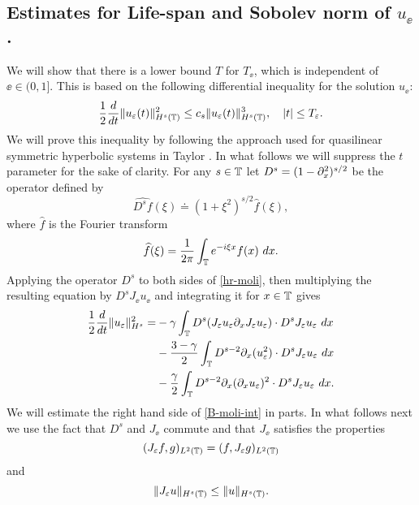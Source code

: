\subsection{Estimates  for Life-span and Sobolev norm of $u_\ee$.}
%
We will show that there is a lower bound  $T$
for $T_\ee$, which is  independent of $\ee\in(0, 1]$.
This is based on the following differential
inequality for the solution $u_\ee$:
%
\begin{equation} 
\label{B-diff-ineq}
\frac 12
\frac{d}{dt}
\|u_\varepsilon(t)\|_{H^{s}(\mathbb{T})}^2
\le
c_s
\|u_\varepsilon(t)\|_{H^{s}(\mathbb{T})}^3,
\quad
|t| \le T_\varepsilon.
\end{equation}
%
%
We will prove this inequality  by
following the approach used for quasilinear symmetric
hyperbolic systems in Taylor \cite{Taylor_1991_Pseudodifferent}. In what follows we will suppress the
$t$ parameter for the sake of clarity.
%
For any $s\in \mathbb{T}$ let   $D^s=(1-\partial_x^2)^{s/2}$ be the  operator
defined by 
%
$$ \widehat{D^s f}(\xi) \doteq (1 + \xi^2)^{s/2} \widehat{f}(\xi), $$
%
where $ \widehat{f}$ is the Fourier transform
%
$$ \widehat{f}(\xi) =  \frac{1}{2\pi}\int_{\mathbb{T}} e^{-i \xi x} f(x) \ dx.  $$
%
Applying the operator $D^s$ to  both sides of  \eqref{hr-moli},
then  multiplying the resulting equation by $D^s J_\ee u_\ee$
and integrating it for $x\in\mathbb{T}$ gives
%
\begin{equation} 
\begin{split}
\label{B-moli-int}
\frac 12
\frac{d}{dt} \|u_\varepsilon \|_{H^s}^2
=
&-
\gamma \int_{\mathbb{T}}  D^s(J_\varepsilon u_\varepsilon \partial_x J_\varepsilon u_\varepsilon) \cdot
D^s J_\varepsilon u_\varepsilon  \  dx
\\
&- \frac{3 -\gamma}{2} \int_{\mathbb{T}} D^{s-2} \partial_x (u_{\varepsilon}^2) 
\cdot D^s J_\varepsilon u_{\varepsilon} \ dx
\\
&- \frac{\gamma}{2} \int_{\mathbb{T}}  D^{s-2} \partial_x (\partial_x u_\varepsilon)^2
\cdot D^s J_\varepsilon u_\varepsilon  \ dx.
\end{split}
\end{equation}
%
We will estimate the right hand side of \eqref{B-moli-int} in parts. In
what follows next we use the fact that  $D^s$ and $J_\ee$ commute and
that  $J_\ee$ satisfies the properties 
%
\begin{equation} 
\label{J-e-inner-prod-property}
(J_\varepsilon f, g)_{L^2(\mathbb{T})}=( f, J_\varepsilon g)_{L^2(\mathbb{T})}
\end{equation}
%
and
%
\begin{equation} 
\label{Je-u-Hs}
\| J_\varepsilon u \|_{H^s(\mathbb{T})}
\le
\|  u \|_{H^s(\mathbb{T})}.
\end{equation}
%
%
%
%
\noindent
